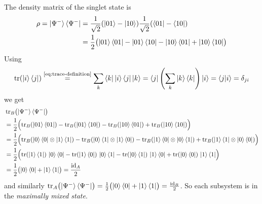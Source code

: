 \begin{example}\label{ex:trace-out-one-subsystem}
The density matrix of the singlet state is
\[
\begin{aligned}
\rho
=
\ket{\Psi^-}\bra{\Psi^-}
&=
\frac{1}{\sqrt{2}}(\ket{01}-\ket{10}) \frac{1}{\sqrt{2}}(\bra{01}-\bra{10})
\\
&=
\frac12\bigl(
\ket{01}\bra{01}
-
\ket{01}\bra{10}
-
\ket{10}\bra{01}
+
\ket{10}\bra{10}
\bigr)
\end{aligned}
\]
Using
\[
\operatorname{tr}(\ket{i}\bra{j})
\overset{\text{\eqref{eq:trace-definition}}}{=}
\sum_k \bra{k}\ket{i}\bra{j}\ket{k}
=
\bra{j}\left(\sum_k \ket{k}\bra{k}\right)\ket{i}
=
\braket{j|i}
=
\delta_{ji}
\]
we get
\[
\begin{aligned}
&\Trace_B \bigl(\ket{\Psi^-}\bra{\Psi^-}\bigr)
\\
&=
\frac12\Bigl(
\Trace_B(\ket{01}\bra{01})
-
\Trace_B(\ket{01}\bra{10})
-
\Trace_B(\ket{10}\bra{01})
+
\Trace_B(\ket{10}\bra{10})
\Bigr)
\\
&= %
\frac12\Bigl(
\Trace_B(\ket{0}\bra{0}\otimes \ket{1}\bra{1})
-
\Trace_B(\ket{0}\bra{1}\otimes \ket{1}\bra{0})
-
{
\Trace_B(\ket{1}\bra{0}\otimes \ket{0}\bra{1})
+
\Trace_B(\ket{1}\bra{1}\otimes \ket{0}\bra{0})
\Bigr)
}
\\
&=
\frac12\Bigl(
\Trace(\ket{1}\bra{1})\,\ket{0}\bra{0}
-
\Trace(\ket{1}\bra{0})\,\ket{0}\bra{1}
-
{
\Trace(\ket{0}\bra{1})\,\ket{1}\bra{0}
+
\Trace(\ket{0}\bra{0})\,\ket{1}\bra{1}
\Bigr)
}
\\
&=
\frac12\bigl(\ket{0}\bra{0}+\ket{1}\bra{1}\bigr)
=
\frac{\id_A}{2}
\end{aligned}
\]
and similarly
\(
\operatorname{tr}_A \bigl(\ket{\Psi^-}\bra{\Psi^-}\bigr)
=
\frac12\bigl(\ket{0}\bra{0}+\ket{1}\bra{1}\bigr)
=
\frac{\operatorname{id}_B}{2}
\).
So each subsystem is in the \emph{maximally mixed state}.


\end{example}

